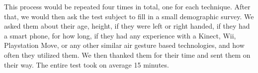 This process would be repeated four times in total, one for each technique. After that, we would then ask the test subject to fill in a small demographic survey. We asked them about their age, height, if they were left or right handed, if they had a smart phone, for how long, if they had any experience with a Kinect, Wii, Playstation Move, or any other similar air gesture based technologies, and how often they utilized them. We then thanked them for their time and sent them on their way. The entire test took on average 15 minutes. 